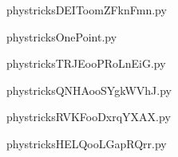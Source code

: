     \newcommand{\CaptionFigDEIToomZFknFmn}{<+Type your caption here+>}
    \begin{center}
        
    \end{center}
    phystricksDEIToomZFknFmn.py

    

    \clearpage
    


    \newcommand{\CaptionFigOnePoint}{<+Type your caption here+>}
    \begin{center}
        
    \end{center}
    phystricksOnePoint.py

    

    \clearpage
    


    \newcommand{\CaptionFigTRJEooPRoLnEiG}{<+Type your caption here+>}
    \begin{center}
        
    \end{center}
    phystricksTRJEooPRoLnEiG.py

    

    \clearpage
    


    \newcommand{\CaptionFigQNHAooSYgkWVhJ}{<+Type your caption here+>}
    \begin{center}
        
    \end{center}
    phystricksQNHAooSYgkWVhJ.py

    

    \clearpage
    


    \newcommand{\CaptionFigRVKFooDxrqYXAX}{<+Type your caption here+>}
    \begin{center}
        
    \end{center}
    phystricksRVKFooDxrqYXAX.py

    

    \clearpage
    


    \newcommand{\CaptionFigHELQooLGapRQrr}{<+Type your caption here+>}
    \begin{center}
        
    \end{center}
    phystricksHELQooLGapRQrr.py

